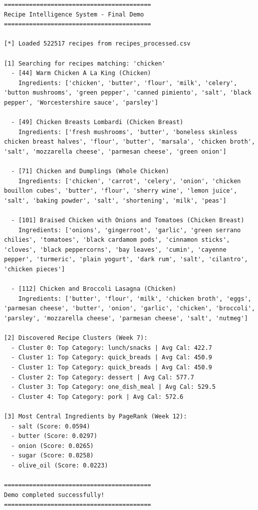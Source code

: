 \documentclass[11pt,a4paper]{article}
\begin{document}
\begin{verbatim}
=========================================
Recipe Intelligence System - Final Demo
=========================================

[*] Loaded 522517 recipes from recipes_processed.csv

[1] Searching for recipes matching: 'chicken'
  - [44] Warm Chicken A La King (Chicken)
    Ingredients: ['chicken', 'butter', 'flour', 'milk', 'celery', 'button mushrooms', 'green pepper', 'canned pimiento', 'salt', 'black pepper', 'Worcestershire sauce', 'parsley']

  - [49] Chicken Breasts Lombardi (Chicken Breast)
    Ingredients: ['fresh mushrooms', 'butter', 'boneless skinless chicken breast halves', 'flour', 'butter', 'marsala', 'chicken broth', 'salt', 'mozzarella cheese', 'parmesan cheese', 'green onion']

  - [71] Chicken and Dumplings (Whole Chicken)
    Ingredients: ['chicken', 'carrot', 'celery', 'onion', 'chicken bouillon cubes', 'butter', 'flour', 'sherry wine', 'lemon juice', 'salt', 'baking powder', 'salt', 'shortening', 'milk', 'peas']

  - [101] Braised Chicken with Onions and Tomatoes (Chicken Breast)
    Ingredients: ['onions', 'gingerroot', 'garlic', 'green serrano chilies', 'tomatoes', 'black cardamom pods', 'cinnamon sticks', 'cloves', 'black peppercorns', 'bay leaves', 'cumin', 'cayenne pepper', 'turmeric', 'plain yogurt', 'dark rum', 'salt', 'cilantro', 'chicken pieces']

  - [112] Chicken and Broccoli Lasagna (Chicken)
    Ingredients: ['butter', 'flour', 'milk', 'chicken broth', 'eggs', 'parmesan cheese', 'butter', 'onion', 'garlic', 'chicken', 'broccoli', 'parsley', 'mozzarella cheese', 'parmesan cheese', 'salt', 'nutmeg']

[2] Discovered Recipe Clusters (Week 7):
  - Cluster 0: Top Category: lunch/snacks | Avg Cal: 422.7
  - Cluster 1: Top Category: quick_breads | Avg Cal: 450.9
  - Cluster 1: Top Category: quick_breads | Avg Cal: 450.9
  - Cluster 2: Top Category: dessert | Avg Cal: 577.7
  - Cluster 3: Top Category: one_dish_meal | Avg Cal: 529.5
  - Cluster 4: Top Category: pork | Avg Cal: 572.6

[3] Most Central Ingredients by PageRank (Week 12):
  - salt (Score: 0.0594)
  - butter (Score: 0.0297)
  - onion (Score: 0.0265)
  - sugar (Score: 0.0258)
  - olive_oil (Score: 0.0223)

=========================================
Demo completed successfully!
=========================================
\end{verbatim}
\end{document}
